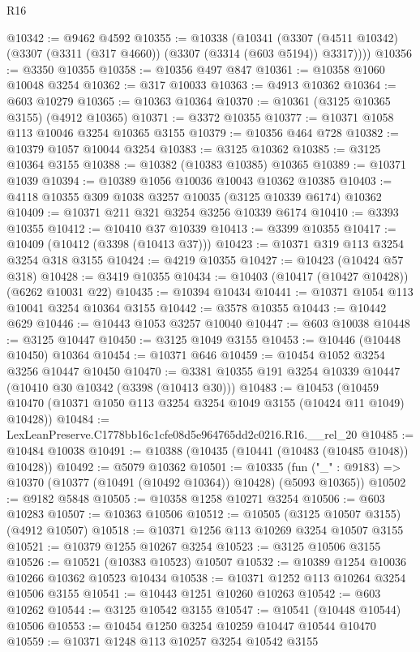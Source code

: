 \begin{lexlean}{R16}
\begin{coremodule}
@10342 := @9462 @4592
@10355 := @10338
    (@10341 (@3307 (@4511 @10342) (@3307 (@3311 (@317 @4660)) (@3307 (@3314 (@603 @5194)) @3317))))
@10356 := @3350 @10355
@10358 := @10356 @497 @847
@10361 := @10358 @1060 @10048 @3254
@10362 := @317 @10033
@10363 := @4913 @10362
@10364 := @603 @10279
@10365 := @10363 @10364
@10370 := @10361 (@3125 @10365 @3155) (@4912 @10365)
@10371 := @3372 @10355
@10377 := @10371 @1058 @113 @10046 @3254 @10365 @3155
@10379 := @10356 @464 @728
@10382 := @10379 @1057 @10044 @3254
@10383 := @3125 @10362
@10385 := @3125 @10364 @3155
@10388 := @10382 (@10383 @10385) @10365
@10389 := @10371 @1039
@10394 := @10389 @1056 @10036 @10043 @10362 @10385
@10403 := @4118 @10355 @309 @1038 @3257 @10035 (@3125 @10339 @6174) @10362
@10409 := @10371 @211 @321 @3254 @3256 @10339 @6174
@10410 := @3393 @10355
@10412 := @10410 @37 @10339
@10413 := @3399 @10355
@10417 := @10409 (@10412 (@3398 (@10413 @37)))
@10423 := @10371 @319 @113 @3254 @3254 @318 @3155
@10424 := @4219 @10355
@10427 := @10423 (@10424 @57 @318)
@10428 := @3419 @10355
@10434 := @10403 (@10417 (@10427 @10428)) (@6262 @10031 @22)
@10435 := @10394 @10434
@10441 := @10371 @1054 @113 @10041 @3254 @10364 @3155
@10442 := @3578 @10355
@10443 := @10442 @629
@10446 := @10443 @1053 @3257 @10040
@10447 := @603 @10038
@10448 := @3125 @10447
@10450 := @3125 @1049 @3155
@10453 := @10446 (@10448 @10450) @10364
@10454 := @10371 @646
@10459 := @10454 @1052 @3254 @3256 @10447 @10450
@10470 := @3381 @10355 @191 @3254 @10339 @10447 (@10410 @30 @10342 (@3398 (@10413 @30)))
@10483 := @10453
    (@10459 @10470 (@10371 @1050 @113 @3254 @3254 @1049 @3155 (@10424 @11 @1049) @10428))
@10484 := LexLeanPreserve.C1778bb16c1cfe08d5e964765dd2c0216.R16.__rel_20
@10485 := @10484 @10038
@10491 := @10388 (@10435 (@10441 (@10483 (@10485 @1048)) @10428))
@10492 := @5079 @10362
@10501 := @10335
    (fun ("_" : @9183) => @10370 (@10377 (@10491 (@10492 @10364)) @10428) (@5093 @10365))
@10502 := @9182 @5848
@10505 := @10358 @1258 @10271 @3254
@10506 := @603 @10283
@10507 := @10363 @10506
@10512 := @10505 (@3125 @10507 @3155) (@4912 @10507)
@10518 := @10371 @1256 @113 @10269 @3254 @10507 @3155
@10521 := @10379 @1255 @10267 @3254
@10523 := @3125 @10506 @3155
@10526 := @10521 (@10383 @10523) @10507
@10532 := @10389 @1254 @10036 @10266 @10362 @10523 @10434
@10538 := @10371 @1252 @113 @10264 @3254 @10506 @3155
@10541 := @10443 @1251 @10260 @10263
@10542 := @603 @10262
@10544 := @3125 @10542 @3155
@10547 := @10541 (@10448 @10544) @10506
@10553 := @10454 @1250 @3254 @10259 @10447 @10544 @10470
@10559 := @10371 @1248 @113 @10257 @3254 @10542 @3155

\end{coremodule}
\end{lexlean}
